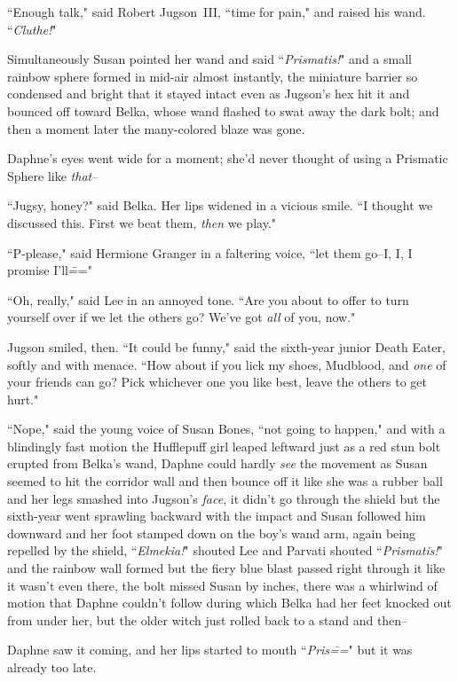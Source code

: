 ``Enough talk," said Robert Jugson~III, ``time for pain," and raised his wand. ``\emph{Cluthe!}"

Simultaneously Susan pointed her wand and said ``\emph{Prismatis!}" and a small rainbow sphere formed in mid-air almost instantly, the miniature barrier so condensed and bright that it stayed intact even as Jugson's hex hit it and bounced off toward Belka, whose wand flashed to swat away the dark bolt; and then a moment later the many-colored blaze was gone.

Daphne's eyes went wide for a moment; she'd never thought of using a Prismatic Sphere like \emph{that}\---

``Jugsy, honey?" said Belka. Her lips widened in a vicious smile. ``I thought we discussed this. First we beat them, \emph{then} we play."

``P-please," said Hermione Granger in a faltering voice, ``let them go\---I, I, I promise I'll\==="

``Oh, really," said Lee in an annoyed tone. ``Are you about to offer to turn yourself over if we let the others go? We've got \emph{all} of you, now."

Jugson smiled, then. ``It could be funny," said the sixth-year junior Death Eater, softly and with menace. ``How about if you lick my shoes, Mudblood, and \emph{one} of your friends can go? Pick whichever one you like best, leave the others to get hurt."

``Nope," said the young voice of Susan Bones, ``not going to happen," and with a blindingly fast motion the Hufflepuff girl leaped leftward just as a red stun bolt erupted from Belka's wand, Daphne could hardly \emph{see} the movement as Susan seemed to hit the corridor wall and then bounce off it like she was a rubber ball and her legs smashed into Jugson's \emph{face}, it didn't go through the shield but the sixth-year went sprawling backward with the impact and Susan followed him downward and her foot stamped down on the boy's wand arm, again being repelled by the shield, ``\emph{Elmekia!}" shouted Lee and Parvati shouted ``\emph{Prismatis!}" and the rainbow wall formed but the fiery blue blast passed right through it like it wasn't even there, the bolt missed Susan by inches, there was a whirlwind of motion that Daphne couldn't follow during which Belka had her feet knocked out from under her, but the older witch just rolled back to a stand and then\---

Daphne saw it coming, and her lips started to mouth ``\emph{Pris\===}" but it was already too late.

